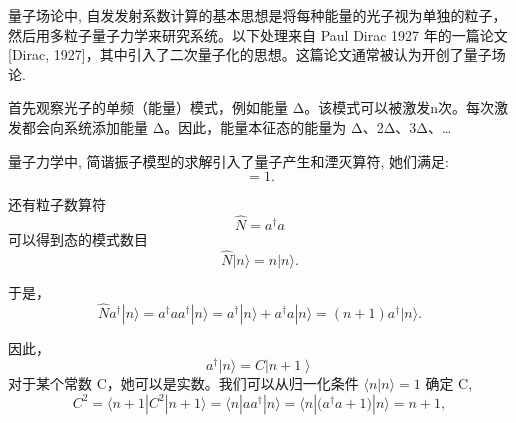 \documentclass[14pt,a4paper,oneside]{article}
\numberwithin{equation}{section}             %
\numberwithin{figure}{section}               %
\begin{document}
量子场论中, 自发发射系数计算的基本思想是将每种能量的光子视为单独的粒子，然后用多粒子量子力学来研究系统。以下处理来自 Paul Dirac 1927 年的一篇论文 [Dirac, 1927]，其中引入了二次量子化的思想。这篇论文通常被认为开创了量子场论. 

首先观察光子的单频（能量）模式，例如能量 Δ。该模式可以被激发n次。每次激发都会向系统添加能量 Δ。因此，能量本征态的能量为 Δ、2Δ、3Δ、…

量子力学中, 简谐振子模型的求解引入了量子产生和湮灭算符, 她们满足:
\begin{equation}
    [a,a^\dagger]=1.
    \label{eq:1.11}
\end{equation}

还有粒子数算符
\begin{equation}
    \hat{N}=a^\dagger a
    \label{eq:1.12}
\end{equation}
可以得到态的模式数目
\begin{equation}
    \hat{N}|n\rangle=n|n\rangle.
    \label{eq:1.13}
\end{equation}

于是，
\begin{equation}
    \hat{N}a^\dagger|n\rangle=a^\dagger aa^\dagger|n\rangle=a^\dagger|n\rangle+a^\dagger a|n\rangle=(n+1)a^\dagger|n\rangle.
    \label{eq:1.14}
\end{equation}

因此，
\begin{equation}
    a^\dagger|n\rangle=C\left|n+1\right\rangle 
    \label{eq:1.15}
\end{equation}
对于某个常数 C，她可以是实数。我们可以从归一化条件 $\langle n|n\rangle=1$ 确定 C, 
\begin{equation}
    C^2=\langle n+1|C^2|n+1\rangle=\langle n|aa^\dagger|n\rangle=\langle n|\big(a^\dagger a+1\big)|n\rangle=n+1,
    \label{eq:1.15}
\end{equation}







\newpage

\clearpage           %




\end{document}
